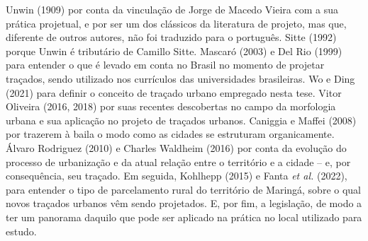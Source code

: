 \documentclass[12pt, a4paper]{book} %
\begin{document}
                
        Unwin (1909) por conta da vinculação de Jorge de Macedo Vieira com a sua prática projetual, e por ser um dos clássicos da literatura de projeto, mas que, diferente de outros autores, não foi traduzido para o português. Sitte (1992) porque Unwin é tributário de Camillo Sitte. Mascaró (2003) e Del Rio (1999) para entender o que é levado em conta no Brasil no momento de projetar traçados, sendo utilizado nos currículos das universidades brasileiras. Wo e Ding (2021) para definir o conceito de traçado urbano empregado nesta tese. Vitor Oliveira (2016, 2018) por suas recentes descobertas no campo da morfologia urbana e sua aplicação no projeto de traçados urbanos. Caniggia e Maffei (2008) por trazerem à baila o modo como as cidades se estruturam organicamente. Álvaro Rodriguez (2010) e Charles Waldheim (2016) por conta da evolução do processo de urbanização e da atual relação entre o território e a cidade – e, por consequência, seu traçado. Em seguida, Kohlhepp (2015) e Fanta \textit{et al.} (2022), para entender o tipo de parcelamento rural do território de Maringá, sobre o qual novos traçados urbanos vêm sendo projetados. E, por fim, a legislação, de modo a ter um panorama daquilo que pode ser aplicado na prática no local utilizado para estudo.
   
\end{document}
